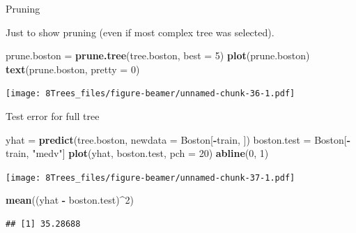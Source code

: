 \documentclass[10pt,ignorenonframetext,]{beamer}
\newenvironment{Shaded}{\begin{snugshade}}{\end{snugshade}}
\newcommand{\KeywordTok}[1]{\textcolor[rgb]{0.13,0.29,0.53}{\textbf{#1}}}
\newcommand{\DataTypeTok}[1]{\textcolor[rgb]{0.13,0.29,0.53}{#1}}
\newcommand{\DecValTok}[1]{\textcolor[rgb]{0.00,0.00,0.81}{#1}}
\newcommand{\StringTok}[1]{\textcolor[rgb]{0.31,0.60,0.02}{#1}}
\newcommand{\OperatorTok}[1]{\textcolor[rgb]{0.81,0.36,0.00}{\textbf{#1}}}
\newcommand{\NormalTok}[1]{#1}
\begin{document}
\begin{frame}[fragile]

\begin{block}{Pruning}

Just to show pruning (even if most complex tree was selected).

\begin{Shaded}
\begin{Highlighting}[]
\NormalTok{prune.boston =}\StringTok{ }\KeywordTok{prune.tree}\NormalTok{(tree.boston, }\DataTypeTok{best =} \DecValTok{5}\NormalTok{)}
\KeywordTok{plot}\NormalTok{(prune.boston)}
\KeywordTok{text}\NormalTok{(prune.boston, }\DataTypeTok{pretty =} \DecValTok{0}\NormalTok{)}
\end{Highlighting}
\end{Shaded}

\texttt{[image: 8Trees\_files/figure-beamer/unnamed-chunk-36-1.pdf]}

\end{block}

\end{frame}

\begin{frame}[fragile]

\begin{block}{Test error for full tree}

\begin{Shaded}
\begin{Highlighting}[]
\NormalTok{yhat =}\StringTok{ }\KeywordTok{predict}\NormalTok{(tree.boston, }\DataTypeTok{newdata =}\NormalTok{ Boston[}\OperatorTok{-}\NormalTok{train, ])}
\NormalTok{boston.test =}\StringTok{ }\NormalTok{Boston[}\OperatorTok{-}\NormalTok{train, }\StringTok{"medv"}\NormalTok{]}
\KeywordTok{plot}\NormalTok{(yhat, boston.test, }\DataTypeTok{pch =} \DecValTok{20}\NormalTok{)}
\KeywordTok{abline}\NormalTok{(}\DecValTok{0}\NormalTok{, }\DecValTok{1}\NormalTok{)}
\end{Highlighting}
\end{Shaded}

\texttt{[image: 8Trees\_files/figure-beamer/unnamed-chunk-37-1.pdf]}

\begin{Shaded}
\begin{Highlighting}[]
\KeywordTok{mean}\NormalTok{((yhat }\OperatorTok{-}\StringTok{ }\NormalTok{boston.test)}\OperatorTok{^}\DecValTok{2}\NormalTok{)}
\end{Highlighting}
\end{Shaded}

\begin{verbatim}
## [1] 35.28688
\end{verbatim}

\end{block}

\end{frame}
\end{document}
